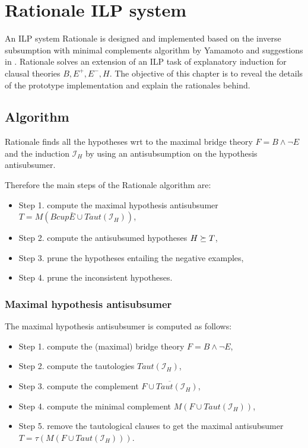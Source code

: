 \chapter{Rationale ILP system}\label{chap:rationale_ilp_system}
An ILP system Rationale is designed and implemented based on the inverse subsumption with minimal complements algorithm  by Yamamoto\cite{yamamoto2012inverse} and suggestions in . Rationale solves an extension of an ILP task of explanatory induction for clausal theories $B, E^+, E^-, H$. The objective of this chapter is to reveal the details of the prototype implementation and explain the rationales behind.

\section{Algorithm}
Rationale finds all the hypotheses wrt to the maximal bridge theory $F=B \land \neg E$ and the induction $\mathcal{I}_H$ by using an antisubsumption on the hypothesis antisubsumer.

Therefore the main steps of the Rationale algorithm are:
\begin{itemize}
\item Step 1. compute the maximal hypothesis antisubsumer $T=M(B 
cup \bar{E} \cup Taut(\mathcal{I}_H))$,
\item Step 2. compute the antisubsumed hypotheses $H \succeq T$,
\item Step 3. prune the hypotheses entailing the negative examples,
\item Step 4. prune the inconsistent hypotheses.
\end{itemize}

\subsection{Maximal hypothesis antisubsumer}
The maximal hypothesis antisubsumer is computed as follows:

\begin{itemize}
\item Step 1. compute the (maximal) bridge theory $F=B \land \neg E$,
\item Step 2. compute the tautologies $Taut(\mathcal{I}_H)$,
\item Step 3. compute the complement $\overline{F \cup Taut(\mathcal{I}_H)}$,
\item Step 4. compute the minimal complement $M(F \cup Taut(\mathcal{I}_H))$,
\item Step 5. remove the tautological clauses to get the maximal antisubsumer $T=\tau(M(F \cup Taut(\mathcal{I}_H)))$.
\end{itemize}

